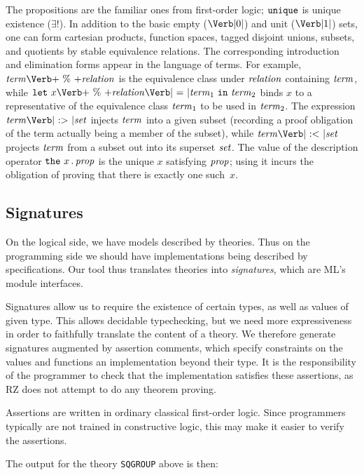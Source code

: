 The propositions are the familiar ones from first-order logic;
$\mbox{\texttt{unique}}$ is unique existence ($\exists!$). In addition to the basic
empty ($\ZERO$) and unit ($\ONE$) sets, one can form cartesian
products, function spaces, tagged disjoint unions, subsets, and
quotients by stable equivalence relations. The corresponding
introduction and elimination forms appear in the language of terms.
For example, $\Term \PERCENT \metav{relation}$ is the equivalence
class under $\mbox{\textit{relation}}$ containing $\mbox{\textit{term}}$, while $\LET\ x
\PERCENT \metav{relation} \mbox{\Verb| = |} \Term_1\ \IN\ \Term_2$
binds $x$ to a representative of the equivalence class $\mbox{\textit{term}}_1$ to be
used in $\mbox{\textit{term}}_2$. The expression $\Term \SUBIN \Set$ injects $\mbox{\textit{term}}$
into a given subset (recording a proof obligation of the term actually
being a member of the subset), while $\Term \SUBOUT \Set$ projects
$\mbox{\textit{term}}$ from a subset out into its superset $\mbox{\textit{set}}$. The value of the
description operator $\mbox{\texttt{the}}\ x \,.\, \mbox{\textit{prop}}$ is the unique $x$
satisfying $\mbox{\textit{prop}}$; using it incurs the obligation of proving that
there is exactly one such~$x$.


\subsection{Signatures}
\label{sec:signatures}

On the logical side, we have models described by theories.  Thus on
the programming side we should have implementations being described by
specifications.  Our tool thus translates theories into
\emph{signatures}, which are ML's module interfaces.

Signatures allow us to require the existence of certain types, as well
as values of given type.  This allows decidable typechecking, but we
need more expressiveness in order to faithfully translate the content
of a theory.  We therefore generate signatures augmented by assertion
comments, which specify constraints on the values and functions an
implementation beyond their type.  It is the responsibility of the
programmer to check that the implementation satisfies these
assertions, as RZ does not attempt to do any theorem proving.

Assertions are written in ordinary classical first-order logic. Since
programmers typically are not trained in constructive logic, this may
make it easier to verify the assertions.

The output for the theory \Verb|SQGROUP| above is then:

